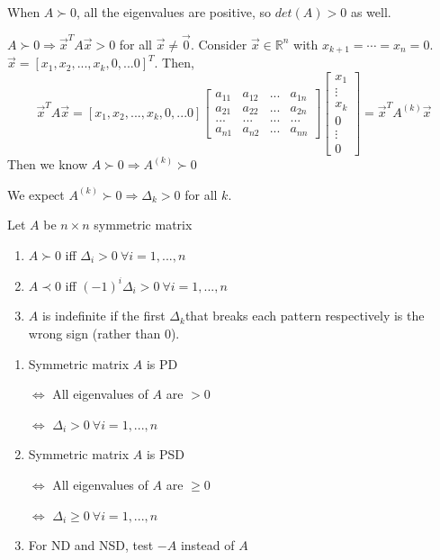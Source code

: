 \documentclass[11pt]{elegantbook}
\begin{document}
When $A\succ 0$, all the eigenvalues are positive, so $det(A) > 0$ as well.

$A\succ 0\Rightarrow \vec{x}^TA\vec{x}>0$ for all $\vec{x}\neq \vec{0}$. Consider $\vec{x}\in \mathbb{R}^n$ with $x_{k+1}=\cdots=x_n=0$. $\vec{x}=[x_1,x_2,...,x_k,0,...0]^T$. Then,
$$\vec{x}^TA\vec{x}=[x_1,x_2,...,x_k,0,...0]\begin{bmatrix}
    a_{11}&a_{12}&... &a_{1n}\\a_{21}&a_{22}&...&a_{2n}\\...&...&...&...\\a_{n1}&a_{n2}&...&a_{nn}
\end{bmatrix}\begin{bmatrix}
    x_1\\
    \vdots\\
    x_k\\
    0\\
    \vdots\\
    0
\end{bmatrix}=\vec{x}^TA^{(k)}\vec{x}$$
Then we know $A\succ 0 \Rightarrow A^{(k)}\succ 0$

We expect $A^{(k)}\succ 0\Rightarrow \Delta_k>0$ for all $k$.

\begin{theorem}Let $A$ be $n\times n$ symmetric matrix
    \begin{enumerate}
        \item $A\succ 0$ iff $\Delta_i>0\ \forall i=1,...,n$
        \item $A\prec 0$ iff $(-1)^i\Delta_i>0\ \forall i=1,...,n$
        \item $A$ is indefinite if the first $\Delta_k$that breaks each pattern respectively is the wrong sign (rather than 0).
    \end{enumerate}
\end{theorem}
\begin{proposition}
    \quad

\begin{enumerate}
    \item Symmetric matrix $A$ is PD

    $\Leftrightarrow$ All eigenvalues of $A$ are $>0$
    
    $\Leftrightarrow$ $\Delta_i>0\ \forall i=1,...,n$
    \item Symmetric matrix $A$ is PSD

    $\Leftrightarrow$ All eigenvalues of $A$ are $\geq 0$
    
    $\Leftrightarrow$ $\Delta_i\geq 0\ \forall i=1,...,n$
    \item For ND and NSD, test $-A$ instead of $A$
\end{enumerate}
\end{proposition}
\end{document}
